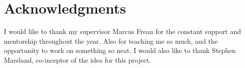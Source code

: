 \chapter*{Acknowledgments}\label{C:ack}
I would like to thank my supervisor Marcus Frean for the constant support and
mentorship throughout the year. Also for teaching me so much, and the opportunity to
work on something so neat. I would also like to
thank Stephen Marsland, co-inceptor of the idea for this project.
